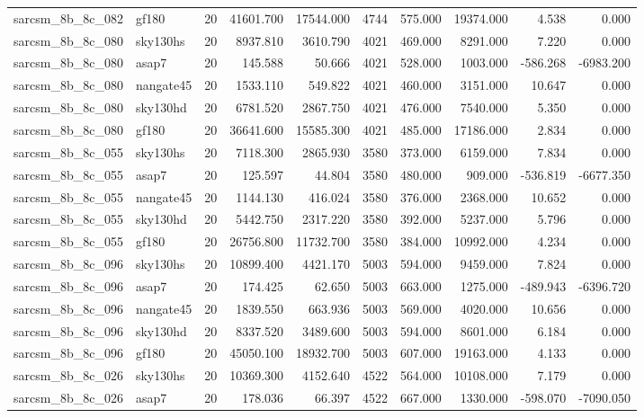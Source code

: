 \begin{tabular}{llrrrrrrrr}
sarcsm\_8b\_8c\_082 & gf180 & 20 & 41601.700 & 17544.000 & 4744 & 575.000 & 19374.000 & 4.538 & 0.000 \\
sarcsm\_8b\_8c\_080 & sky130hs & 20 & 8937.810 & 3610.790 & 4021 & 469.000 & 8291.000 & 7.220 & 0.000 \\
sarcsm\_8b\_8c\_080 & asap7 & 20 & 145.588 & 50.666 & 4021 & 528.000 & 1003.000 & -586.268 & -6983.200 \\
sarcsm\_8b\_8c\_080 & nangate45 & 20 & 1533.110 & 549.822 & 4021 & 460.000 & 3151.000 & 10.647 & 0.000 \\
sarcsm\_8b\_8c\_080 & sky130hd & 20 & 6781.520 & 2867.750 & 4021 & 476.000 & 7540.000 & 5.350 & 0.000 \\
sarcsm\_8b\_8c\_080 & gf180 & 20 & 36641.600 & 15585.300 & 4021 & 485.000 & 17186.000 & 2.834 & 0.000 \\
sarcsm\_8b\_8c\_055 & sky130hs & 20 & 7118.300 & 2865.930 & 3580 & 373.000 & 6159.000 & 7.834 & 0.000 \\
sarcsm\_8b\_8c\_055 & asap7 & 20 & 125.597 & 44.804 & 3580 & 480.000 & 909.000 & -536.819 & -6677.350 \\
sarcsm\_8b\_8c\_055 & nangate45 & 20 & 1144.130 & 416.024 & 3580 & 376.000 & 2368.000 & 10.652 & 0.000 \\
sarcsm\_8b\_8c\_055 & sky130hd & 20 & 5442.750 & 2317.220 & 3580 & 392.000 & 5237.000 & 5.796 & 0.000 \\
sarcsm\_8b\_8c\_055 & gf180 & 20 & 26756.800 & 11732.700 & 3580 & 384.000 & 10992.000 & 4.234 & 0.000 \\
sarcsm\_8b\_8c\_096 & sky130hs & 20 & 10899.400 & 4421.170 & 5003 & 594.000 & 9459.000 & 7.824 & 0.000 \\
sarcsm\_8b\_8c\_096 & asap7 & 20 & 174.425 & 62.650 & 5003 & 663.000 & 1275.000 & -489.943 & -6396.720 \\
sarcsm\_8b\_8c\_096 & nangate45 & 20 & 1839.550 & 663.936 & 5003 & 569.000 & 4020.000 & 10.656 & 0.000 \\
sarcsm\_8b\_8c\_096 & sky130hd & 20 & 8337.520 & 3489.600 & 5003 & 594.000 & 8601.000 & 6.184 & 0.000 \\
sarcsm\_8b\_8c\_096 & gf180 & 20 & 45050.100 & 18932.700 & 5003 & 607.000 & 19163.000 & 4.133 & 0.000 \\
sarcsm\_8b\_8c\_026 & sky130hs & 20 & 10369.300 & 4152.640 & 4522 & 564.000 & 10108.000 & 7.179 & 0.000 \\
sarcsm\_8b\_8c\_026 & asap7 & 20 & 178.036 & 66.397 & 4522 & 667.000 & 1330.000 & -598.070 & -7090.050 \\

\end{tabular}
